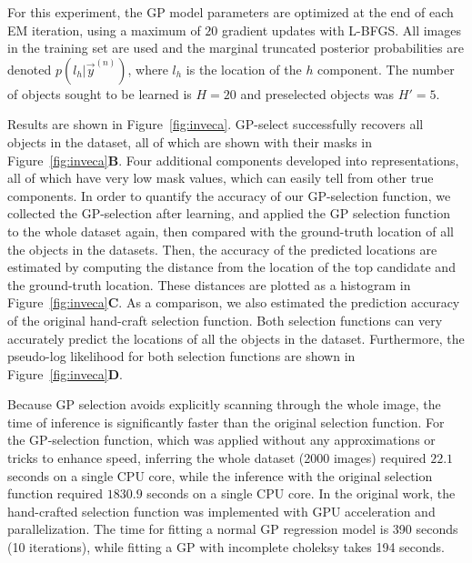 %
For this experiment, the GP model parameters are optimized at the end of each EM iteration, using a maximum of $20$ gradient updates with L-BFGS.
All images in the training set are used and the marginal truncated posterior probabilities are denoted $p(l_h | \vec{y}^{(n)})$, where $l_h$ is the location of the $h$ component. The number of objects sought to be learned is $H=20$ and preselected objects was $H'=5$.

Results are shown in Figure~\ref{fig:inveca}.
GP-select successfully recovers all objects in the dataset, all of which are shown with their masks in Figure~\ref{fig:inveca}\textbf{B}.
Four additional components developed into representations, all of which have very low mask values,  which can easily tell from other true components.
In order to quantify the accuracy of our GP-selection function, we collected the GP-selection after learning, and applied the GP selection function to the whole dataset again, then compared with the ground-truth location of all the objects in the datasets.
%
Then, the accuracy of the predicted locations are estimated by computing the distance from the location of the top candidate and the ground-truth location.
These distances are plotted as a histogram in Figure~\ref{fig:inveca}\textbf{C}.
As a comparison, we also estimated the prediction accuracy of the original hand-craft selection function. Both selection functions can very accurately predict the locations of all the objects in the dataset.
Furthermore, the pseudo-log likelihood for both selection functions are shown in Figure~\ref{fig:inveca}\textbf{D}.

Because GP selection avoids explicitly scanning through the whole image, the time of inference is significantly faster than the original selection function. For the GP-selection function, which was applied without any approximations or tricks to enhance speed, inferring the whole dataset (2000 images) required $22.1$ seconds on a single CPU core, while the inference with the original selection function required $1830.9$ seconds on a single CPU core.
In the original work, the hand-crafted selection function was implemented with GPU acceleration and parallelization. The time for fitting a normal GP regression model is 390 seconds (10 iterations), while fitting a GP with incomplete choleksy takes 194 seconds.




